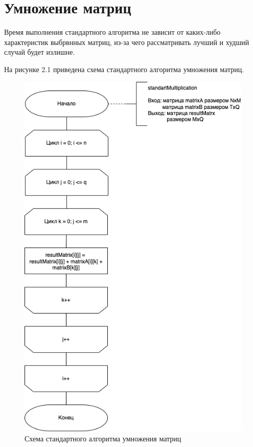 \section{Умножение матриц}

Время выполнения стандартного алгоритма не зависит от каких-либо характеристик выбрвнных матриц, из-за чего рассматривать лучший и худший случай будет излишне.

На рисунке 2.1 приведена схема стандартного алгоритма умножения матриц.

\begin{figure}[ht!]
	\centering
	\includegraphics[width=0.9\linewidth]{img/Standard.png}
	\caption{Схема стандартного алгоритма умножения матриц}
	\label{fig:mpr}
\end{figure}

\newpage

